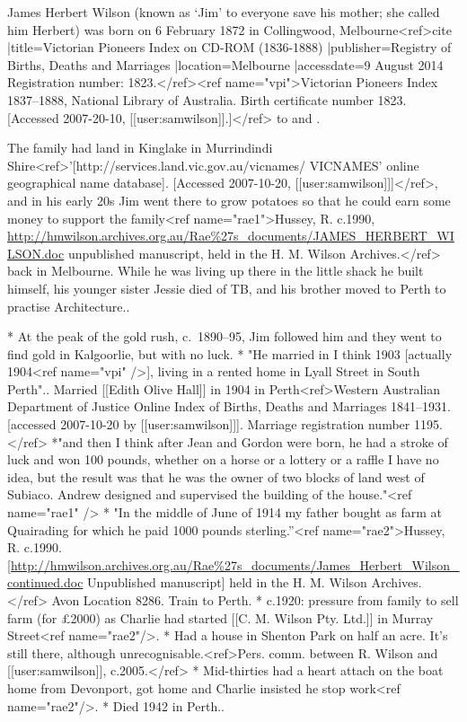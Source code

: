 


James Herbert Wilson (known as `Jim' to everyone save his mother; she called him Herbert) was born on 6 February 1872 in Collingwood, Melbourne<ref>{{cite |title=Victorian Pioneers Index on CD-ROM (1836-1888) |publisher=Registry of Births, Deaths and Marriages |location=Melbourne |accessdate=9 August 2014}} Registration number: 1823.</ref><ref name="vpi">Victorian Pioneers Index 1837–1888, National Library of Australia.  Birth certificate number 1823.  [Accessed 2007-20-10, [[user:samwilson]].]</ref> to  and \bioref{}.

The family had land in Kinglake in Murrindindi Shire<ref>'[http://services.land.vic.gov.au/vicnames/ VICNAMES' online geographical name database]. [Accessed 2007-10-20, [[user:samwilson]]]</ref>, and in his early 20s Jim went there to grow potatoes so that he could earn some money to support the family<ref name="rae1">Hussey, R. c.1990, \url{http://hmwilson.archives.org.au/Rae\%27s_documents/JAMES_HERBERT_WILSON.doc} unpublished manuscript, held in the  H. M. Wilson Archives.</ref> back in Melbourne. While he was living up there in the little shack he built himself, his younger sister Jessie died of TB, and his brother  moved to Perth to practise Architecture.\cite{rae1}.

* At the peak of the gold rush, c.~1890--95, Jim followed him and they went to find gold in Kalgoorlie, but with no luck\cite{rae1}.
* "He married in I think 1903 [actually 1904<ref name="vpi" />], living in a rented home in Lyall Street in South Perth".\cite{rae1}. Married [[Edith Olive Hall]] in 1904 in Perth<ref>Western Australian Department of Justice Online Index of Births, Deaths and Marriages 1841–1931. [accessed 2007-10-20 by [[user:samwilson]]].  Marriage registration number 1195.</ref>
*"and then I think after Jean and Gordon were born, he had a stroke of luck and won 100 pounds, whether on a horse or a lottery or a raffle I have no idea, but the result was that he was the owner of two blocks of land west of Subiaco. Andrew designed and supervised the building of the house."<ref name="rae1" />
* "In the middle of June of 1914 my father bought as farm at Quairading for which he paid 1000 pounds sterling.''\cite{rae2}<ref name="rae2">Hussey, R. c.1990.  [\url{http://hmwilson.archives.org.au/Rae\%27s_documents/James_Herbert_Wilson_continued.doc} Unpublished manuscript] held in the H. M. Wilson Archives.</ref> Avon Location 8286. Train to Perth.
* c.1920: pressure from family to sell farm (for £2000) as Charlie had started [[C. M. Wilson Pty. Ltd.]] in Murray Street<ref name="rae2"/>.
* Had a house in Shenton Park on half an acre. It's still there, although unrecognisable.<ref>Pers. comm. between R. Wilson and [[user:samwilson]], c.2005.</ref>
* Mid-thirties had a heart attach on the boat home from Devonport, got home and Charlie insisted he stop work<ref name="rae2"/>.
* Died 1942 in Perth.\cite{rae2}.
